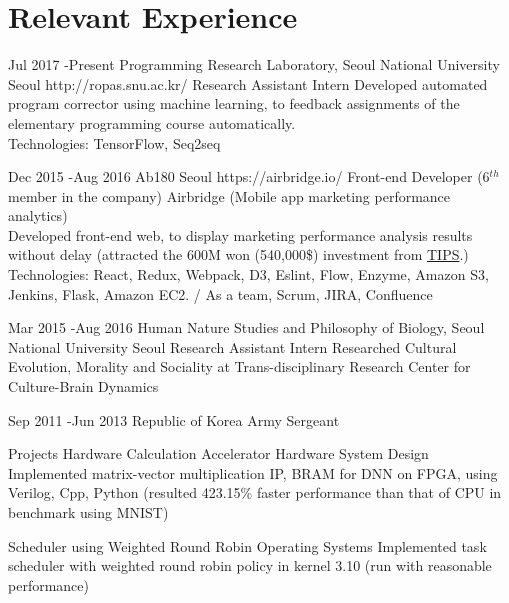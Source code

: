 \documentclass[10pt]{article} %
\begin{document}



\section{Relevant Experience}

\job
{Jul 2017 -}{Present}
{Programming Research Laboratory, Seoul National University}
{Seoul}
{http://ropas.snu.ac.kr/}
{Research Assistant Intern}
{Developed automated program corrector using machine learning, to feedback assignments of the elementary programming course automatically.\\
Technologies: TensorFlow, Seq2seq}

\job
{Dec 2015 -}{Aug 2016}
{Ab180}
{Seoul}
{https://airbridge.io/}
{Front-end Developer (6$^{th}$ member in the company)}
{Airbridge (Mobile app marketing performance analytics)\\
Developed front-end web, to display marketing performance analysis results without delay (attracted the 600M won (540,000\$) investment from \href{http://www.jointips.or.kr/}{TIPS}.)\\
Technologies: React, Redux, Webpack, D3, Eslint, Flow, Enzyme, Amazon S3, Jenkins, Flask, Amazon EC2. / As a team, Scrum, JIRA, Confluence}

\if{}
\job
{Mar 2015 -}{Aug 2016}
{Human Nature Studies and Philosophy of Biology, Seoul National University}
{Seoul}
{}
{Research Assistant Intern}
{Researched Cultural Evolution, Morality and Sociality at Trans-disciplinary Research Center for Culture-Brain Dynamics}

\job
{Sep 2011 -}{Jun 2013}
{Republic of Korea Army}
{}
{}
{Sergeant}
\fi


\project
{Projects}
{Hardware Calculation Accelerator}
{Hardware System Design}
{Implemented matrix-vector multiplication IP, BRAM for DNN on FPGA, using Verilog, Cpp, Python (resulted 423.15\% faster performance than that of CPU in benchmark using MNIST)}

\project
{}
{Scheduler using Weighted Round Robin}
{Operating Systems}
{Implemented task scheduler with weighted round robin policy in kernel 3.10 (run with reasonable performance)}
\end{document}
